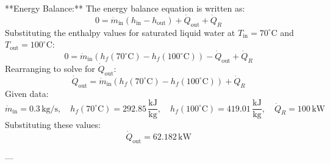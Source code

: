 **Energy Balance:**  
The energy balance equation is written as:  
\[
0 = \dot{m}_{\text{in}} \left( h_{\text{in}} - h_{\text{out}} \right) + \dot{Q}_{\text{out}} + \dot{Q}_R
\]  
Substituting the enthalpy values for saturated liquid water at \( T_{\text{in}} = 70^\circ\text{C} \) and \( T_{\text{out}} = 100^\circ\text{C} \):  
\[
0 = \dot{m}_{\text{in}} \left( h_f(70^\circ\text{C}) - h_f(100^\circ\text{C}) \right) - \dot{Q}_{\text{out}} + \dot{Q}_R
\]  
Rearranging to solve for \( \dot{Q}_{\text{out}} \):  
\[
\dot{Q}_{\text{out}} = \dot{m}_{\text{in}} \left( h_f(70^\circ\text{C}) - h_f(100^\circ\text{C}) \right) + \dot{Q}_R
\]  
Given data:  
\[
\dot{m}_{\text{in}} = 0.3 \, \text{kg/s}, \quad h_f(70^\circ\text{C}) = 292.85 \, \frac{\text{kJ}}{\text{kg}}, \quad h_f(100^\circ\text{C}) = 419.01 \, \frac{\text{kJ}}{\text{kg}}, \quad \dot{Q}_R = 100 \, \text{kW}
\]  
Substituting these values:  
\[
\dot{Q}_{\text{out}} = 62.182 \, \text{kW}
\]  

---